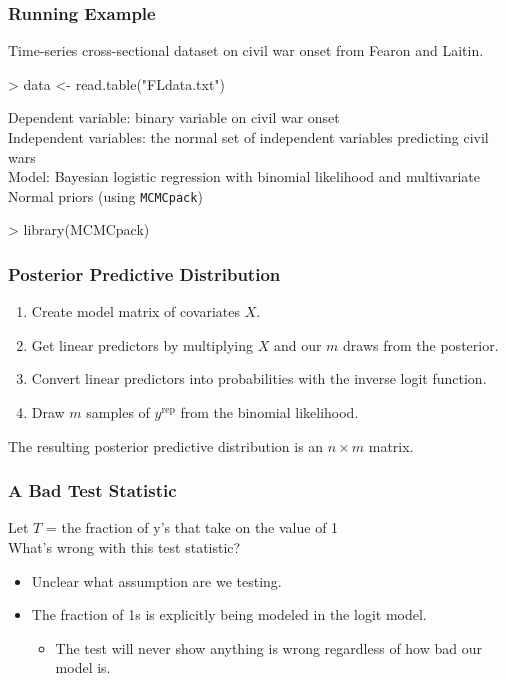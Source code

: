 \documentclass{beamer}
\begin{document}
\begin{frame}[fragile]
\frametitle{Running Example}
\pause
Time-series cross-sectional dataset on civil war onset from Fearon and Laitin.
\pause
\tiny
\medskip
\begin{Schunk}
\begin{Sinput}
> data <- read.table("FLdata.txt")
\end{Sinput}
\end{Schunk}
\normalsize
\pause
\bigskip
Dependent variable: binary variable on civil war onset\\
\pause
\bigskip
Independent variables: the normal set of independent variables
predicting civil wars \\
\pause
\bigskip
Model: Bayesian logistic regression with binomial likelihood and
multivariate Normal priors (using {\tt MCMCpack})
\pause
\tiny
\medskip
\begin{Schunk}
\begin{Sinput}
> library(MCMCpack)
\end{Sinput}
\end{Schunk}
\normalsize
\end{frame}

\begin{frame}[fragile]
\frametitle{Posterior Predictive Distribution}
\pause
\begin{enumerate}
\item Create model matrix of covariates $X$.
\tiny 
\medskip
\pause
\pause
\normalsize
\medskip
\item Get linear predictors by multiplying $X$ and our $m$ draws from
the posterior.
\tiny 
\medskip
\pause
\pause
\normalsize
\medskip
\item Convert linear predictors into probabilities with the inverse logit function.
\tiny 
\medskip
\pause
\pause
\normalsize
\medskip
\item Draw $m$ samples of $y^{\mathrm{rep}}$ from the binomial likelihood.
\tiny 
\medskip
\pause
\pause
\normalsize
\end{enumerate}
The resulting posterior predictive distribution is an $n \times m$
matrix.
\end{frame}

\begin{frame}
\frametitle{A Bad Test Statistic}
\pause
Let $T$ = the fraction of y's that take on the value of 1 \\
\bigskip
\pause
What's wrong with this test statistic?
\pause
\medskip
\begin{itemize}
\item Unclear what assumption are we testing.
\pause
\item The fraction of 1s is explicitly being modeled in the logit model.
\pause
\begin{itemize}
\item The test will never show anything is wrong regardless of how bad
our model is.
\end{itemize}
\end{itemize}
\end{frame}
\end{document}
